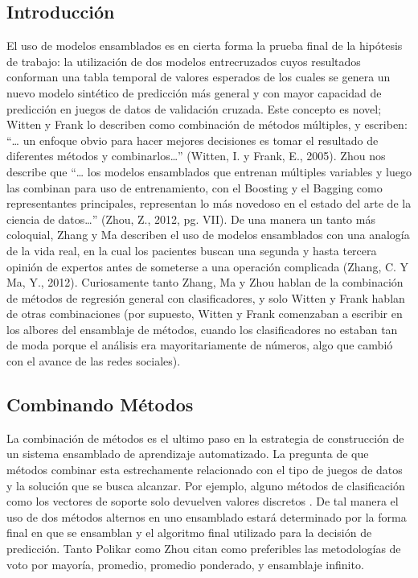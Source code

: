 \documentclass[letterpaper, spanish, 11pt]{report}
\begin{document}
\subsection{Introducción}
El uso de modelos ensamblados es en cierta forma la prueba final de la hipótesis de trabajo: la utilización de dos modelos entrecruzados cuyos resultados conforman una tabla temporal de valores esperados de los cuales se genera un nuevo modelo sintético de predicción más general y con mayor capacidad de predicción en juegos de datos de validación cruzada. Este concepto es novel; Witten y Frank lo describen como combinación de métodos múltiples, y escriben: “… un enfoque obvio para hacer mejores decisiones es tomar el resultado de diferentes métodos y combinarlos…” (Witten, I. y Frank, E., 2005). Zhou nos describe que “… los modelos ensamblados que entrenan múltiples variables y luego las combinan para uso de entrenamiento, con el Boosting y el Bagging como representantes principales, representan lo más novedoso en el estado del arte de la ciencia de datos…” (Zhou, Z., 2012, pg. VII). De una manera un tanto más coloquial, Zhang y Ma describen el uso de modelos ensamblados con una analogía de la vida real, en la cual los pacientes buscan una segunda y hasta tercera opinión de expertos antes de someterse a una operación complicada (Zhang, C. Y Ma, Y., 2012). Curiosamente tanto Zhang, Ma y Zhou hablan de la combinación de métodos de regresión general con clasificadores, y solo Witten y Frank hablan de otras combinaciones (por supuesto, Witten y Frank comenzaban a escribir en los albores del ensamblaje de métodos, cuando los clasificadores no estaban tan de moda porque el análisis era mayoritariamente de números, algo que cambió con el avance de las redes sociales).

\subsection{Combinando Métodos}
La combinación de métodos es el ultimo paso en la estrategia de construcción de un sistema ensamblado de aprendizaje automatizado. La pregunta de que métodos combinar esta estrechamente relacionado con el tipo de juegos de datos y la solución que se busca alcanzar. Por ejemplo, alguno métodos de clasificación como los vectores de soporte solo devuelven valores discretos \cite{ensembleMachineLearning}. De tal manera el uso de dos métodos alternos en uno ensamblado estará determinado por la forma final en que se ensamblan y el algoritmo final utilizado para la decisión de predicción. Tanto Polikar \cite{ensembleMachineLearning} como Zhou \cite{ensembleMethods} citan como preferibles las metodologías de voto por mayoría, promedio, promedio ponderado, y ensamblaje infinito.
\end{document}

